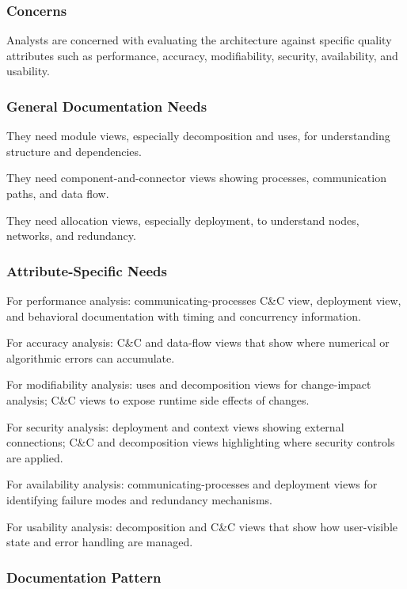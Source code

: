 \documentclass[11pt]{article}
\begin{document}
\subsubsection{Concerns}

Analysts are concerned with evaluating the architecture against specific quality attributes such as performance, accuracy, modifiability, security, availability, and usability.

\subsubsection{General Documentation Needs}

They need module views, especially decomposition and uses, for understanding structure and dependencies.

They need component-and-connector views showing processes, communication paths, and data flow.

They need allocation views, especially deployment, to understand nodes, networks, and redundancy.

\subsubsection{Attribute-Specific Needs}

For performance analysis: communicating-processes C\&C view, deployment view, and behavioral documentation with timing and concurrency information.

For accuracy analysis: C\&C and data-flow views that show where numerical or algorithmic errors can accumulate.

For modifiability analysis: uses and decomposition views for change-impact analysis; C\&C views to expose runtime side effects of changes.

For security analysis: deployment and context views showing external connections; C\&C and decomposition views highlighting where security controls are applied.

For availability analysis: communicating-processes and deployment views for identifying failure modes and redundancy mechanisms.

For usability analysis: decomposition and C\&C views that show how user-visible state and error handling are managed.

\subsubsection{Documentation Pattern}
\end{document}
